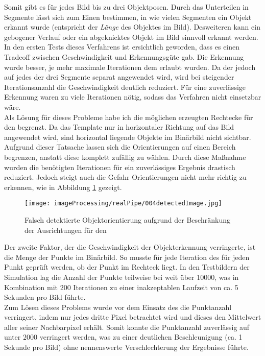 Somit gibt es für jedes Bild bis zu drei Objektposen. Durch das Unterteilen in Segmente lässt sich zum Einen bestimmen, in wie vielen Segmenten ein Objekt erkannt wurde (entspricht der \textit{Länge} des Objektes im Bild). Desweiteren kann ein gebogener Verlauf oder ein abgeknicktes Objekt im Bild sinnvoll erkannt werden.\\
In den ersten Tests dieses Verfahrens ist ersichtlich geworden, dass es einen Tradeoff zwischen Geschwindigkeit und Erkennungsgüte gab. Die Erkennung wurde besser, je mehr maximale Iterationen dem \rans erlaubt wurden. Da der \rans jedoch auf jedes der drei Segmente separat angewendet wird, wird bei steigender Iterationsanzahl die Geschwindigkeit deutlich reduziert. Für eine zuverlässige Erkennung waren zu viele Iterationen nötig, sodass das Verfahren nicht einsetzbar wäre.\\
Als Lösung für dieses Probleme habe ich die möglichen erzeugten Rechtecke für den \rans begrenzt. Da das Template nur in horizontaler Richtung auf das Bild angewendet wird, sind horizontal liegende Objekte im Binärbild nicht sichtbar. Aufgrund dieser Tatsache lassen sich die Orientierungen auf einen Bereich begrenzen, anstatt diese komplett zufällig zu wählen. Durch diese Maßnahme wurden die benötigten Iterationen für ein zuverlässiges Ergebnis drastisch reduziert. Jedoch steigt auch die Gefahr Orientierungen nicht mehr richtig zu erkennen, wie in Abbildung \ref{detecFail} gezeigt.\\
\begin{figure}[H]
\centering
\texttt{[image: imageProcessing/realPipe/004detectedImage.jpg]}
\caption{Falsch detektierte Objektorientierung aufgrund der Beschränkung der Ausrichtungen für den \rans}
\label{detecFail}
\end{figure}
Der zweite Faktor, der die Geschwindigkeit der Objekterkennung verringerte, ist die Menge der Punkte im Binärbild. So musste für jede Iteration des \rans für jeden Punkt geprüft werden, ob der Punkt im Rechteck liegt. In den Testbildern der Simulation lag die Anzahl der Punkte teilweise bei weit über $10000$, was in Kombination mit $200$ Iterationen zu einer inakzeptablen Laufzeit von ca. 5 Sekunden pro Bild führte.\\
Zum Lösen dieses Problems wurde vor dem Einsatz des \rans die Punktanzahl verringert, indem nur jedes dritte Pixel betrachtet wird und dieses den Mittelwert aller seiner Nachbarpixel erhält.  Somit konnte die Punktanzahl zuverlässig auf unter $2000$ verringert werden, was zu einer deutlichen Beschleunigung (ca. 1 Sekunde pro Bild) ohne nennenswerte Verschlechterung der Ergebnisse führte.

